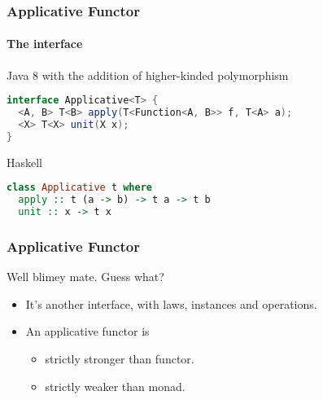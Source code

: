 \begin{frame}[fragile]
\frametitle{Applicative Functor}
\framesubtitle{The interface}
\begin{block}{Java 8 with the addition of higher-kinded polymorphism}
\begin{lstlisting}[style=language,language=java]
interface Applicative<T> {
  <A, B> T<B> apply(T<Function<A, B>> f, T<A> a);
  <X> T<X> unit(X x);
}
\end{lstlisting}
\end{block}
\begin{block}{Haskell}
\begin{lstlisting}[style=language,language=haskell]
class Applicative t where
  apply :: t (a -> b) -> t a -> t b
  unit :: x -> t x
\end{lstlisting}
\end{block}
\end{frame}

\begin{frame}[fragile]
\frametitle{Applicative Functor}
\begin{block}{Well blimey mate. Guess what?}
\begin{itemize}
\item It's another interface, with laws, instances and operations.
\item An applicative functor is
  \begin{itemize}
  \item strictly stronger than functor.
  \item strictly weaker than monad.
  \end{itemize}
\end{itemize}
\end{block}
\end{frame}
